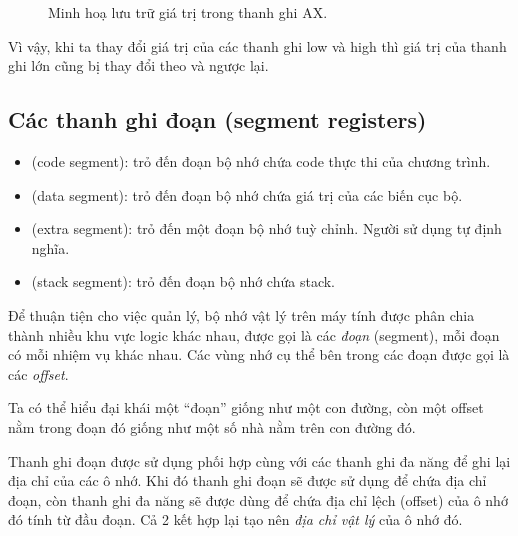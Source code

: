 \documentclass[main.tex]{subfiles}
\begin{document}
\begin{figure}[H]
    \centering
    \caption{Minh hoạ lưu trữ giá trị trong thanh ghi AX.}
\end{figure}

Vì vậy, khi ta thay đổi giá trị của các thanh ghi low và high thì giá trị của thanh ghi lớn cũng bị thay đổi theo và ngược lại.

\subsection{Các thanh ghi đoạn (segment registers)}
\begin{itemize}
    \item {} (code segment): trỏ đến đoạn bộ nhớ chứa code thực thi của chương trình.
    \item {} (data segment): trỏ đến đoạn bộ nhớ chứa giá trị của các biến cục bộ.
    \item {} (extra segment): trỏ đến một đoạn bộ nhớ tuỳ chỉnh. Người sử dụng tự định nghĩa.
    \item {} (stack segment): trỏ đến đoạn bộ nhớ chứa stack.
\end{itemize}

Để thuận tiện cho việc quản lý, bộ nhớ vật lý trên máy tính được phân chia thành nhiều khu vực logic khác nhau, được gọi là các \textit{đoạn} (segment), mỗi đoạn có mỗi nhiệm vụ khác nhau. Các vùng nhớ cụ thể bên trong các đoạn được gọi là các \textit{offset}.

Ta có thể hiểu đại khái một ``đoạn'' giống như một con đường, còn một offset nằm trong đoạn đó giống như một số nhà nằm trên con đường đó.

Thanh ghi đoạn được sử dụng phối hợp cùng với các thanh ghi đa năng để ghi lại địa chỉ của các ô nhớ. Khi đó thanh ghi đoạn sẽ được sử dụng để chứa địa chỉ đoạn, còn thanh ghi đa năng sẽ được dùng để chứa địa chỉ lệch (offset) của ô nhớ đó tính từ đầu đoạn. Cả 2 kết hợp lại tạo nên \textit{địa chỉ vật lý} của ô nhớ đó.
\end{document}
